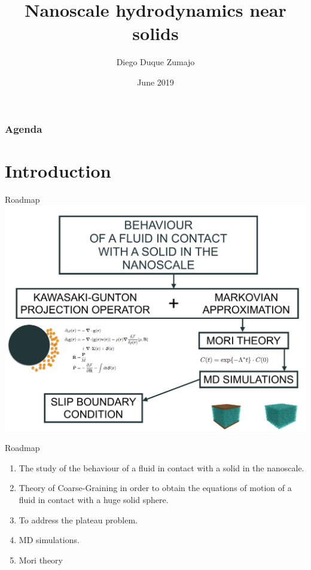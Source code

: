 \documentclass{beamer}
\title{Nanoscale hydrodynamics near solids}
\date{June 2019}
\author{Diego Duque Zumajo}
\institute{Departamento Física Fundamental \\Universidad Nacional de Educación a Distancia}
\begin{document}
\maketitle

\begin{frame}
\frametitle{Agenda}
\tableofcontents
\end{frame}


\section{Introduction}
\begin{frame}{Roadmap}
  \includegraphics[width=\linewidth]{scheme-thesis}

\end{frame}
\begin{frame}{Roadmap}
  \begin{enumerate}
    \item The study of \alert{the behaviour of a fluid in contact with a solid} in the nanoscale. 
    \item Theory of Coarse-Graining in order to obtain the equations of motion of a fluid in contact with a huge solid sphere.
    \item To address the plateau problem.
    \item MD simulations. 
    \item Mori theory 
  \end{enumerate}
\end{frame}
\end{document}
